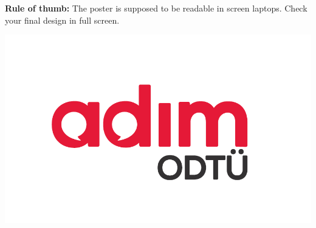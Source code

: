 \documentclass[a0paper,fontscale=0.5]{baposter} %
\begin{document}
\begin{poster}
{        \textbf{Rule of thumb:}
        The poster is supposed to be readable in screen laptops. Check your final design in full screen.


        \begin{center}
            \includegraphics[width=0.6\linewidth]{AdımODTÜ_logo.PNG}
        \end{center}
    }


\end{poster}
\end{document}
